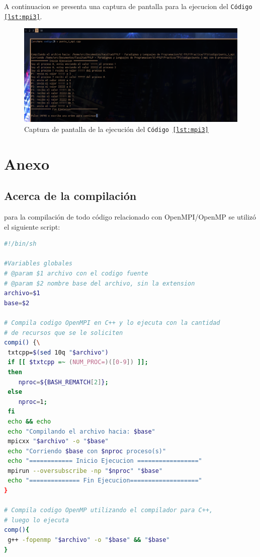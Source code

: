\documentclass{article}
\begin{document}
A continuacion se presenta una captura de pantalla para la ejecucion del
\texttt{C\'odigo \ref{lst:mpi3}}.

\begin{figure}[H]
  \centering
  \includegraphics[width=.95\linewidth]{EJ3_Captura}
  \caption{Captura de pantalla de la ejecuci\'on del \texttt{C\'odigo
\ref{lst:mpi3}}}
  \label{fig:ej3_captura}
\end{figure}



\newpage
\section{Anexo}
\subsection{Acerca de la compilaci\'on}
\label{an:compilacion}
para la compilación de todo código relacionado con OpenMPI/OpenMP se utilizó el
siguiente script:

\begin{lstlisting}[language=bash, caption={Script de compilaci\'on}]
#!/bin/sh

#Variables globales
# @param $1 archivo con el codigo fuente
# @param $2 nombre base del archivo, sin la extension
archivo=$1
base=$2

# Compila codigo OpenMPI en C++ y lo ejecuta con la cantidad
# de recursos que se le soliciten
compi() {\
 txtcpp=$(sed 10q "$archivo")
 if [[ $txtcpp =~ (NUM_PROC=)([0-9]) ]];
 then
    nproc=${BASH_REMATCH[2]};
 else
    nproc=1;
 fi
 echo && echo
 echo "Compilando el archivo hacia: $base"
 mpicxx "$archivo" -o "$base"
 echo "Corriendo $base con $nproc proceso(s)"
 echo "============ Inicio Ejecucion ================="
 mpirun --oversubscribe -np "$nproc" "$base"
 echo "============== Fin Ejecucion==================="
}

# Compila codigo OpenMP utilizando el compilador para C++,
# luego lo ejecuta
comp(){
 g++ -fopenmp "$archivo" -o "$base" && "$base"
}
\end{lstlisting}
\end{document}
